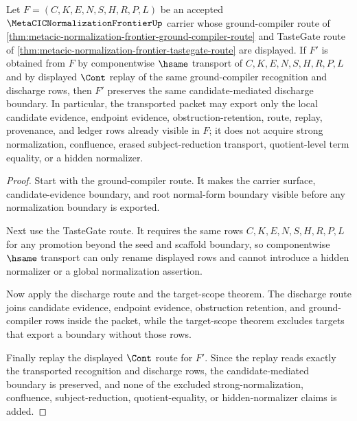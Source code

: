 \begin{theorem}
\label{thm:metacic-normalization-frontier-candidate-discharge-stability}
Let $F=(C,K,E,N,S,H,R,P,L)$ be an accepted $\MetaCICNormalizationFrontierUp$ carrier whose ground-compiler route of \autoref{thm:metacic-normalization-frontier-ground-compiler-route} and TasteGate route of \autoref{thm:metacic-normalization-frontier-tastegate-route} are displayed. If $F'$ is obtained from $F$ by componentwise $\hsame$ transport of $C,K,E,N,S,H,R,P,L$ and by displayed $\Cont$ replay of the same ground-compiler recognition and discharge rows, then $F'$ preserves the same candidate-mediated discharge boundary. In particular, the transported packet may export only the local candidate evidence, endpoint evidence, obstruction-retention, route, replay, provenance, and ledger rows already visible in $F$; it does not acquire strong normalization, confluence, erased subject-reduction transport, quotient-level term equality, or a hidden normalizer.
\end{theorem}
\begin{proof}
Start with the ground-compiler route. It makes the carrier surface, candidate-evidence boundary, and root normal-form boundary visible before any normalization boundary is exported.

Next use the TasteGate route. It requires the same rows $C,K,E,N,S,H,R,P,L$ for any promotion beyond the seed and scaffold boundary, so componentwise $\hsame$ transport can only rename displayed rows and cannot introduce a hidden normalizer or a global normalization assertion.

Now apply the discharge route and the target-scope theorem. The discharge route joins candidate evidence, endpoint evidence, obstruction retention, and ground-compiler rows inside the packet, while the target-scope theorem excludes targets that export a boundary without those rows.

Finally replay the displayed $\Cont$ route for $F'$. Since the replay reads exactly the transported recognition and discharge rows, the candidate-mediated boundary is preserved, and none of the excluded strong-normalization, confluence, subject-reduction, quotient-equality, or hidden-normalizer claims is added.
\end{proof}

